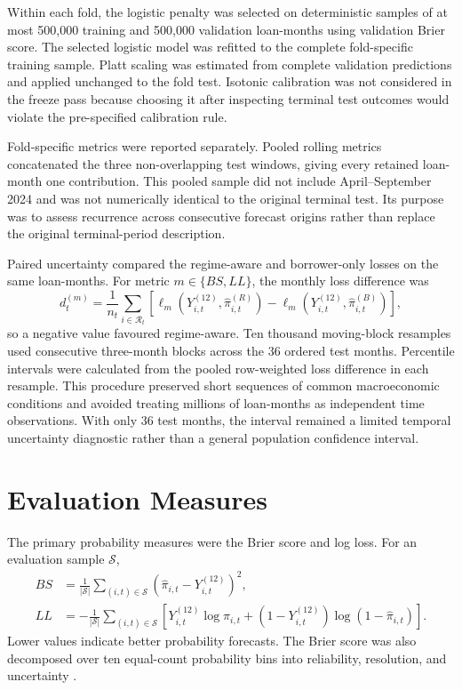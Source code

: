 Within each fold, the logistic penalty was selected on deterministic samples of at most 500,000 training and 500,000 validation loan-months using validation Brier score. The selected logistic model was refitted to the complete fold-specific training sample. Platt scaling was estimated from complete validation predictions and applied unchanged to the fold test. Isotonic calibration was not considered in the freeze pass because choosing it after inspecting terminal test outcomes would violate the pre-specified calibration rule.

Fold-specific metrics were reported separately. Pooled rolling metrics concatenated the three non-overlapping test windows, giving every retained loan-month one contribution. This pooled sample did not include April--September 2024 and was not numerically identical to the original terminal test. Its purpose was to assess recurrence across consecutive forecast origins rather than replace the original terminal-period description.

Paired uncertainty compared the regime-aware and borrower-only losses on the same loan-months. For metric $m\in\{BS,LL\}$, the monthly loss difference was
\begin{equation}
d_t^{(m)}
=
\frac{1}{n_t}\sum_{i\in\mathcal{R}_t}
\left[\ell_m\!\left(Y_{i,t}^{(12)},\widehat\pi_{i,t}^{(R)}\right)
-\ell_m\!\left(Y_{i,t}^{(12)},\widehat\pi_{i,t}^{(B)}\right)\right],
\label{eq:monthly-paired-loss}
\end{equation}
so a negative value favoured regime-aware. Ten thousand moving-block resamples used consecutive three-month blocks across the 36 ordered test months. Percentile intervals were calculated from the pooled row-weighted loss difference in each resample. This procedure preserved short sequences of common macroeconomic conditions and avoided treating millions of loan-months as independent time observations. With only 36 test months, the interval remained a limited temporal uncertainty diagnostic rather than a general population confidence interval.

\section{Evaluation Measures}

The primary probability measures were the Brier score and log loss. For an evaluation sample $\mathcal{S}$,
\begin{align}
BS&=\frac{1}{|\mathcal{S}|}\sum_{(i,t)\in\mathcal{S}}(\widehat\pi_{i,t}-Y_{i,t}^{(12)})^2,\label{eq:brier-score}\\
LL&=-\frac{1}{|\mathcal{S}|}\sum_{(i,t)\in\mathcal{S}}\left[Y_{i,t}^{(12)}\log\widehat\pi_{i,t}+(1-Y_{i,t}^{(12)})\log(1-\widehat\pi_{i,t})\right].\label{eq:log-loss}
\end{align}
Lower values indicate better probability forecasts. The Brier score was also decomposed over ten equal-count probability bins into reliability, resolution, and uncertainty \citep{brier1950,murphy1973vector,dimitriadis2020_reliability}.

